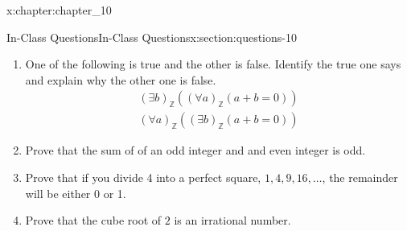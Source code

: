 \documentclass[oneside,10pt,]{book}
\numberwithin{equation}{section}
\begin{document}
\begin{chapterptx}{}{}{}{}{}{x:chapter:chapter_10}
\begin{sectionptx}{In-Class Questions}{}{In-Class Questions}{}{}{x:section:questions-10}
\begin{enumerate}[label=\arabic*.]
\item{}One of the following is true and the other is false.  Identify the true one says and explain why the other one is false.%
\begin{gather*}
(\exists  b)_{\mathbb{Z}} ((\forall a)_{\mathbb{Z}}(a + b = 0))\\
(\forall  a)_{\mathbb{Z}} ((\exists b)_{\mathbb{Z}}(a + b = 0))
\end{gather*}
%
\item{}Prove that the sum of of an odd integer and and even integer is odd.%
\item{}Prove that if you divide 4 into a perfect square, \(1, 4, 9, 16, \dots\), the remainder will be either 0 or 1.%
\item{}Prove that the cube root of \(2\) is an irrational number.%
\end{enumerate}
%
\end{sectionptx}
\end{chapterptx}
%
\backmatter
%
%
%
%
\printindex
%
\end{document}
